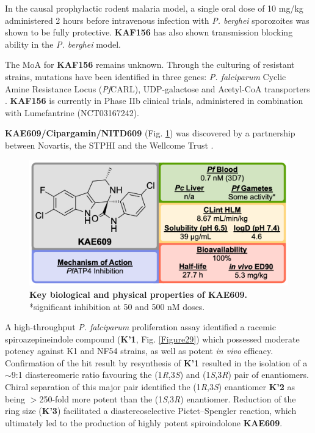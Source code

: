 \documentclass[twocolumn]{bmcart}%
\begin{document}
In the causal prophylactic rodent malaria model, a single oral dose of 10 mg/kg administered 2 hours before intravenous infection with \textit{P. berghei} sporozoites was shown to be fully protective. \textbf{KAF156} has also shown transmission blocking ability in the \textit{P. berghei} model.

The MoA for \textbf{KAF156} remains unknown. Through the culturing of resistant strains, mutations have been identified in three genes: \textit{P. falciparum} Cyclic Amine Resistance Locus (\textit{Pf}CARL), UDP-galactose and Acetyl-CoA transporters \cite{Kuhen2014,MMV}. \textbf{KAF156} is currently in Phase IIb clinical trials, administered in combination with Lumefantrine (NCT03167242).

\hrulefill

\textbf{KAE609/Cipargamin/NITD609} (Fig. \ref{Figure28}) was discovered by a partnership between Novartis, the STPHI and the Wellcome Trust \cite{Rottmann2010,Yeung2010}.

\begin{figure}[h]
	\includegraphics [scale=0.575] {Figure28}
	\caption{{\bf Key biological and physical properties of KAE609.} *significant inhibition at 50 and 500 nM doses.}
	\label{Figure28}
\end{figure}

A high-throughput \textit{P. falciparum} proliferation assay identified a racemic spiroazepineindole compound (\textbf{K'1}, Fig. \ref{Figure29}) which possessed moderate potency against K1 and NF54 strains, as well as potent \textit{in vivo} efficacy. Confirmation of the hit result by resynthesis of \textbf{K'1} resulted in the isolation of a $\sim$9:1 diastereomeric ratio favouring the (1\textit{R},3\textit{S}) and (1\textit{S},3\textit{R}) pair of enantiomers. Chiral separation of this major pair identified the (1\textit{R},3\textit{S}) enantiomer \textbf{K'2} as being $>$250-fold more potent than the (1\textit{S},3\textit{R}) enantiomer. Reduction of the ring size (\textbf{K'3}) facilitated a diastereoselective Pictet--Spengler reaction, which ultimately led to the production of highly potent spiroindolone \textbf{KAE609}.
\end{document}
